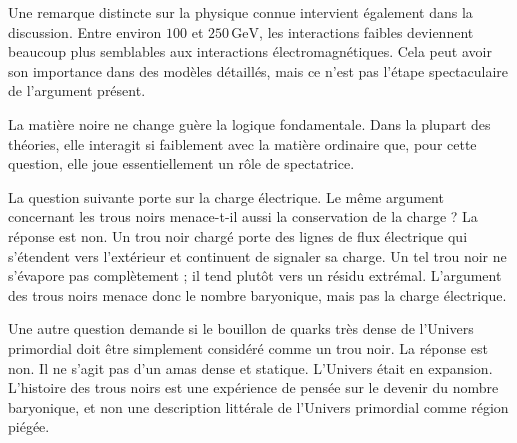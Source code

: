 Une remarque distincte sur la physique connue intervient également dans la discussion. Entre environ \(100\) et \(250\,\mathrm{GeV}\), les interactions faibles deviennent beaucoup plus semblables aux interactions électromagnétiques. Cela peut avoir son importance dans des modèles détaillés, mais ce n’est pas l’étape spectaculaire de l’argument présent.

La matière noire ne change guère la logique fondamentale. Dans la plupart des théories, elle interagit si faiblement avec la matière ordinaire que, pour cette question, elle joue essentiellement un rôle de spectatrice.

\begin{classroomqa}
\end{classroomqa}

La question suivante porte sur la charge électrique. Le même argument concernant les trous noirs menace-t-il aussi la conservation de la charge ? La réponse est non. Un trou noir chargé porte des lignes de flux électrique qui s’étendent vers l’extérieur et continuent de signaler sa charge. Un tel trou noir ne s’évapore pas complètement ; il tend plutôt vers un résidu extrémal. L’argument des trous noirs menace donc le nombre baryonique, mais pas la charge électrique.

Une autre question demande si le bouillon de quarks très dense de l’Univers primordial doit être simplement considéré comme un trou noir. La réponse est non. Il ne s’agit pas d’un amas dense et statique. L’Univers était en expansion. L’histoire des trous noirs est une expérience de pensée sur le devenir du nombre baryonique, et non une description littérale de l’Univers primordial comme région piégée.

\begin{classroomqa}
\end{classroomqa}

